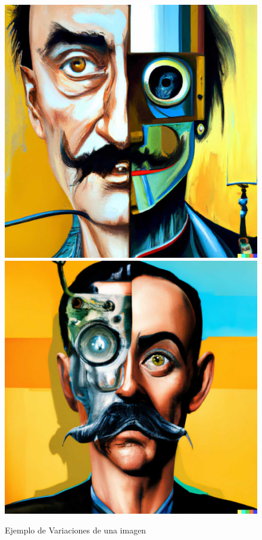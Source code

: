 \documentclass[runningheads]{llncs} %
\begin{document}
\begin{figure}
    \centering
    \includegraphics[scale=0.25]{ej4.1-dalle_1.jpg}
    \includegraphics[scale=0.25]{ej4.2-dalle_1.jpg}
    \caption{Ejemplo de Variaciones de una imagen \cite{ej-dalle}}
    \label{fig:dalle-ej4}
\end{figure}
\end{document}
